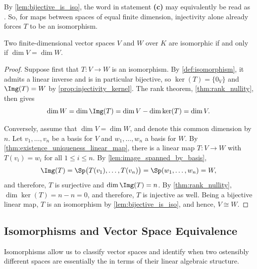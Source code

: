 \begin{remark}
By \cref{lem:bijective_is_iso}, the word  in statement \textbf{(c)} may equivalently be read as . So, for maps between spaces of equal finite dimension, injectivity alone already forces $T$ to be an isomorphism.
\end{remark}

\begin{corollary}
\label{cor:iso_iff_equal_dimension}
Two finite-di\-men\-sional vector spaces $V$ and $W$ over $K$ are isomorphic if and only if $\dim V = \dim W$.
\end{corollary}

\begin{proof}
Suppose first that $T: V \to W$ is an isomorphism. By \cref{def:isomorphism}, it admits a linear inverse and is in particular bijective, so $\ker(T) = \{0_V\}$ and $\Img(T) = W$ by \cref{prop:injectivity_kernel}. The rank theorem, \cref{thm:rank_nullity}, then gives
\[
\dim W = \dim \Img(T) = \dim V - \dim \ker(T) = \dim V.
\]

Conversely, assume that $\dim V = \dim W$, and denote this common dimension by $n$. Let $v_1, \dots, v_n$ be a basis for $V$ and $w_1, \dots, w_n$ a basis for $W$. By \cref{thm:existence_uniqueness_linear_map}, there is a linear map $T: V \to W$ with $T(v_i) = w_i$ for all $1 \le i \le n$. By \cref{lem:image_spanned_by_basis},
\[
\Img(T) = \Sp\big(T(v_1), \dots, T(v_n)\big) = \Sp(w_1, \dots, w_n) = W,
\]
and therefore, $T$ is surjective and $\dim \Img(T) = n$. By \cref{thm:rank_nullity}, $\dim \ker(T) = n - n = 0$, and therefore, $T$ is injective as well. Being a bijective linear map, $T$ is an isomorphism by \cref{lem:bijective_is_iso}, and hence, $V \cong W$.
\end{proof}

\subsection{Isomorphisms and Vector Space Equivalence}

Isomorphisms allow us to classify vector spaces and identify when two ostensibly different spaces are essentially the  in terms of their linear algebraic structure.

